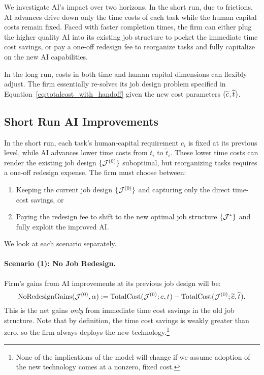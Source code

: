 \documentclass{article}
\theoremstyle{plain}
\theoremstyle{plain}
\begin{document}
We investigate AI’s impact over two horizons.
In the short run, due to frictions, AI advances drive down only the time costs of each task while the human capital costs remain fixed.
Faced with faster completion times, the firm can either plug the higher quality AI into its existing job structure to pocket the immediate time cost savings, or pay a one‐off redesign fee to reorganize tasks and fully capitalize on the new AI capabilities.

In the long run, costs in both time and human capital dimensions can flexibly adjust.
The firm essentially re-solves its job design problem specified in Equation~\ref{eq:totalcost_with_handoff} given the new cost parameters \((\widetilde{c_{}}, \widetilde{t_{}})\).


\subsection{Short Run AI Improvements}

In the short run, each task’s human‐capital requirement \(c_{i}\) is fixed at its previous level, while AI advances lower time costs from \(t_{i}\) to \(\widetilde t_{i}\).  
These lower time costs can render the existing job design \(\{\mathcal{J}^{(0)}\}\) suboptimal, but reorganizing tasks requires a one‐off redesign expense.  
The firm must choose between:  
\begin{enumerate}
  \item Keeping the current job design \(\{\mathcal{J}^{(0)}\}\) and capturing only the direct time‐cost savings, or  
  \item Paying the redesign fee to shift to the new optimal job structure \(\{\mathcal{J}^*\}\) and fully exploit the improved AI.
\end{enumerate}
We look at each scenario separately.

\paragraph{Scenario (1): No Job Redesign.}
Firm's gains from AI improvements at its previous job design will be:
\begin{equation}
\label{eq:no_redesign_gains}
\text{NoRedesignGains}(\mathcal{J}^{(0)}, \alpha)
:=
\text{TotalCost}(\mathcal{J}^{(0)}; c_{}, t_{}) - \text{TotalCost}(\mathcal{J}^{(0)}; \widetilde{c_{}}, \widetilde{t_{}}).
\end{equation}
This is the net gains \emph{only} from immediate time cost savings in the old job structure.
Note that by definition, the time cost savings is weakly greater than zero, so the firm always deploys the new technology.\footnote{None of the implications of the model will change if we assume adoption of the new technology comes at a nonzero, fixed cost.}
\end{document}
